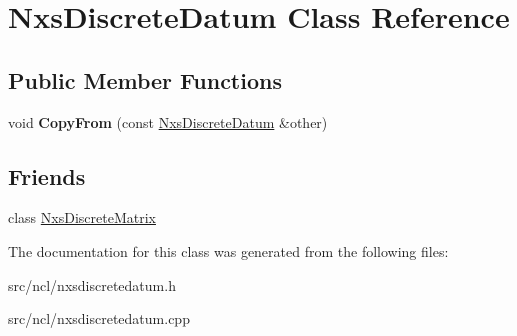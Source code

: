 \hypertarget{classNxsDiscreteDatum}{
\section{NxsDiscreteDatum Class Reference}
\label{classNxsDiscreteDatum}
}
\subsection*{Public Member Functions}
\begin{DoxyCompactItemize}
\item 
\hypertarget{classNxsDiscreteDatum_a17f59c28cd4a83d49c152894d0548ceb}{
void {\bfseries CopyFrom} (const \hyperlink{classNxsDiscreteDatum}{NxsDiscreteDatum} \&other)}
\label{classNxsDiscreteDatum_a17f59c28cd4a83d49c152894d0548ceb}

\end{DoxyCompactItemize}
\subsection*{Friends}
\begin{DoxyCompactItemize}
\item 
\hypertarget{classNxsDiscreteDatum_a6c46ccb809a45095d7976b5d0e4466b2}{
class \hyperlink{classNxsDiscreteDatum_a6c46ccb809a45095d7976b5d0e4466b2}{NxsDiscreteMatrix}}
\label{classNxsDiscreteDatum_a6c46ccb809a45095d7976b5d0e4466b2}

\end{DoxyCompactItemize}


The documentation for this class was generated from the following files:\begin{DoxyCompactItemize}
\item 
src/ncl/nxsdiscretedatum.h\item 
src/ncl/nxsdiscretedatum.cpp\end{DoxyCompactItemize}
